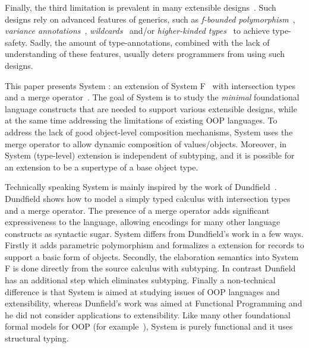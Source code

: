   Finally, the third limitation is prevalent in many extensible
  designs~\cite{}. Such designs rely on advanced features of generics,
  such as \emph{f-bounded polymorphism}~\cite{}, \emph{variance
    annotations}~\cite{}, \emph{wildcards}~\cite{} and/or \emph{higher-kinded
    types}~\cite{} to achieve type-safety. Sadly, the amount of
  type-annotations, combined with the lack of understanding of these
  features, usually deters programmers from using such designs.

\begin{comment}
Motivated by the insights gained in previous work, this paper presents 
a minimal core calculus that addresses current limitations and
provides a better foundational model for statically typed
delegation-based OOP? We show that Object Algebras fit nicely in this
model. 
\end{comment}

This paper presents System \name: an extension of System F~\cite{}
with intersection types and a merge operator~\cite{}.  
The goal of System \name is to study the \emph{minimal} foundational language
constructs that are needed to support various extensible designs,
while at the same time addressing the limitations of existing OOP
languages. To address the lack of good object-level composition
mechanisms, System \name uses the merge operator to allow dynamic
composition of values/objects. Moreover, in System \name (type-level)
extension is independent of subtyping, and it is possible for an
extension to be a supertype of a base object type.


Technically speaking System \name is mainly inspired by the work of
Dundfield~\cite{}.  Dundfield shows how to model a simply typed
calculus with intersection types and a merge operator. The presence of
a merge operator adds significant expressiveness to the language,
allowing encodings for many other language constructs as syntactic
sugar. System \name differs from Dundfield's work in a few
ways. Firstly it adds parametric polymorphism and formalizes a
extension for records to support a basic form of objects. Secondly,
the elaboration semantics into System F is done directly from the
source calculus with subtyping. In contrast Dunfield has an additional
step which eliminates subtyping.  Finally a non-technical difference
is that System \name is aimed at studying issues of OOP languages and
extensibility, whereas Dunfield's work was aimed at Functional
Programming and he did not consider applications to extensibility.
Like many other foundational formal models for OOP (for
example~\cite{}), System \name is purely functional and it uses
structural typing.

